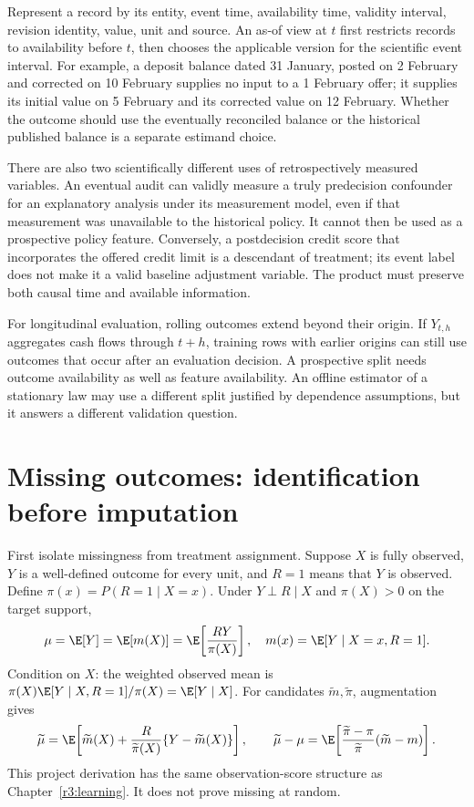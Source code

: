 Represent a record by its entity, event time, availability time, validity
interval, revision identity, value, unit and source. An as-of view at
$t$ first restricts records to availability before $t$, then chooses
the applicable version for the scientific event interval. For example,
a deposit balance dated 31 January, posted on 2 February and corrected
on 10 February supplies no input to a 1 February offer; it supplies
its initial value on 5 February and its corrected value on 12 February.
Whether the outcome should use the eventually reconciled balance or
the historical published balance is a separate estimand choice.

There are also two scientifically different uses of retrospectively
measured variables. An eventual audit can validly measure a truly
predecision confounder for an explanatory analysis under its measurement
model, even if that measurement was unavailable to the historical policy.
It cannot then be used as a prospective policy feature. Conversely,
a postdecision credit score that incorporates the offered credit limit
is a descendant of treatment; its event label does not make it a valid
baseline adjustment variable. The product must preserve both causal
time and available information.

For longitudinal evaluation, rolling outcomes extend beyond their origin.
If $Y_{t,h}$ aggregates cash flows through $t+h$, training rows with
earlier origins can still use outcomes that occur after an evaluation
decision. A prospective split needs outcome availability as well as
feature availability. An offline estimator of a stationary law may use
a different split justified by dependence assumptions, but it answers
a different validation question.

\section{Missing outcomes: identification before imputation}
\label{r3:missingness}
First isolate missingness from treatment assignment. Suppose $X$ is fully
observed, $Y$ is a well-defined outcome for every unit, and $R=1$ means
that $Y$ is observed. Define $\pi(x)=P(R=1\mid X=x)$. Under
$Y\perp R\mid X$ and $\pi(X)>0$ on the target support,
\begin{equation}
 \mu=\E[Y]=\E[m(X)]=\E\!\left[\frac{RY}{\pi(X)}\right],
 \quad m(x)=\E[Y\mid X=x,R=1].
 \label{r3:missing-mean}
\end{equation}
Condition on $X$: the weighted observed mean is
$\pi(X)\E[Y\mid X,R=1]/\pi(X)=\E[Y\mid X]$.
For candidates $\widetilde m,\widetilde\pi$, augmentation gives
\[
 \widetilde\mu=\E\!\left[
 \widetilde m(X)+\frac{R}{\widetilde\pi(X)}\{Y-\widetilde m(X)\}\right],
 \qquad
 \widetilde\mu-\mu=
 \E\!\left[\frac{\widetilde\pi-\pi}{\widetilde\pi}
                              (\widetilde m-m)\right].
\]
This project derivation has the same observation-score structure as
Chapter~\ref{r3:learning}. It does not prove missing at random.

